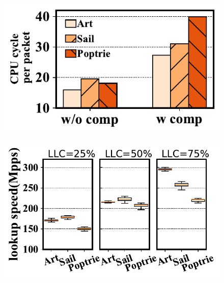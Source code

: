 \documentclass[a4paper]{article}
\begin{document}
\begin{figure}[htbp]
	\includegraphics{../result/example4.pdf}
\end{figure}

\begin{figure}[htbp]
	\includegraphics{../result/example5.pdf}
\end{figure}
\end{document}
